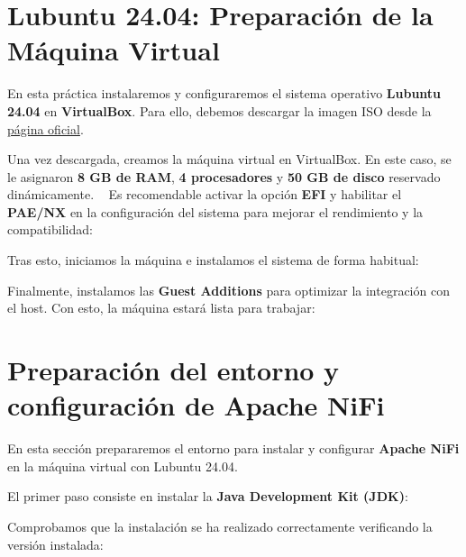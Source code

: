 \documentclass{../../../miPlantilla}
\begin{document}
\maketitle

\section{Lubuntu 24.04: Preparación de la Máquina Virtual}
En esta práctica instalaremos y configuraremos el sistema operativo \textbf{Lubuntu 24.04} en \textbf{VirtualBox}.
Para ello, debemos descargar la imagen ISO desde la \href{https://cdimage.ubuntu.com/lubuntu/releases/noble/release/lubuntu-24.04.3-desktop-amd64.iso}{página oficial}.  

Una vez descargada, creamos la máquina virtual en VirtualBox. En este caso, se le asignaron \textbf{8 GB de RAM}, \textbf{4 procesadores} y \textbf{50 GB de disco} reservado dinámicamente.  
Es recomendable activar la opción \textbf{EFI} y habilitar el \textbf{PAE/NX} en la configuración del sistema para mejorar el rendimiento y la compatibilidad:


Tras esto, iniciamos la máquina e instalamos el sistema de forma habitual:


Finalmente, instalamos las \textbf{Guest Additions} para optimizar la integración con el host. Con esto, la máquina estará lista para trabajar:


\newpage

\section{Preparación del entorno y configuración de Apache NiFi}
En esta sección prepararemos el entorno para instalar y configurar \textbf{Apache NiFi} en la máquina virtual con Lubuntu 24.04.  

El primer paso consiste en instalar la \textbf{Java Development Kit (JDK)}:


Comprobamos que la instalación se ha realizado correctamente verificando la versión instalada:

\end{document}
